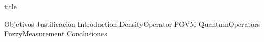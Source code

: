 \documentclass{report}
\begin{document}
{title}

\frontmatter


\tableofcontents



\mainmatter{}
{Objetivos}
{Justificacion}
{Introduction}
{DensityOperator}
{POVM}
{QuantumOperators}
{FuzzyMeasurement}
{Conclusiones}


\newpage

\nocite{gomez2010introduccion}





\end{document}
